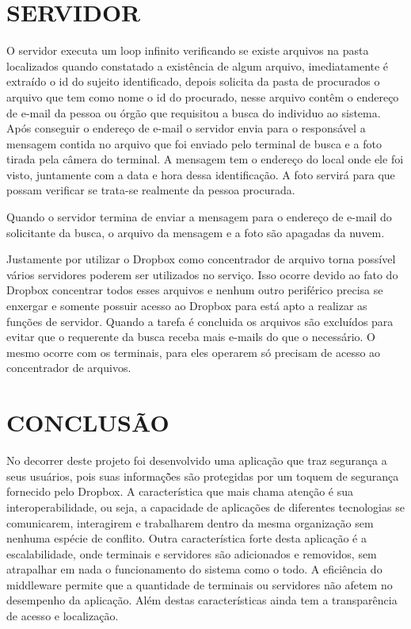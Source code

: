 \documentclass[letterpaper, 10 pt, conference]{ieeeconf}  %
\begin{document}
\section{SERVIDOR}
O servidor executa um loop infinito verificando se existe arquivos na pasta localizados quando constatado a exist\^encia de algum arquivo, imediatamente \'e extra\'ido o id do sujeito identificado, depois solicita da pasta de procurados o arquivo que tem como nome o id do procurado, nesse arquivo cont\^em o endere\c{c}o de e-mail da pessoa ou \'org\~ao que requisitou a busca do individuo ao sistema. Ap\'os conseguir o endere\c{c}o de e-mail o servidor envia para o respons\'avel a mensagem contida no arquivo que foi enviado pelo terminal de busca e a foto tirada pela c\^amera do terminal. A mensagem tem o endere\c{c}o do local onde ele foi visto, juntamente com a data e hora dessa identifica\c{c}\~ao. A foto servir\'a para que possam verificar se trata-se realmente da pessoa procurada.  

Quando o servidor termina de enviar a mensagem para o endere\c{c}o de e-mail do solicitante da busca, o arquivo da mensagem e a foto s\~ao apagadas da nuvem.

Justamente por utilizar o Dropbox como concentrador de arquivo torna poss\'ivel v\'arios servidores poderem ser utilizados no servi\c{c}o. Isso ocorre devido ao fato do Dropbox concentrar todos esses arquivos e nenhum outro perif\'erico precisa se enxergar e somente possuir acesso ao Dropbox para est\'a apto a realizar as fun\c{c}\~oes de servidor. Quando a tarefa é concluida os arquivos s\~ao exclu\'idos para evitar que o requerente da busca receba mais e-mails do que o necess\'ario. O mesmo ocorre com os terminais, para eles operarem s\'o precisam de acesso ao concentrador de arquivos.  

\section{CONCLUS\~AO}

No decorrer deste projeto foi desenvolvido uma aplica\c{c}\~ao que traz seguran\c{c}a a seus usu\'arios, pois suas informa\c{c}\~ões s\~ao protegidas por um toquem de segurança fornecido pelo Dropbox. A caracter\'istica que mais chama aten\c{c}\~ao \'e sua interoperabilidade, ou seja, a capacidade de aplica\c{c}\~oes de diferentes tecnologias se comunicarem, interagirem e trabalharem dentro da mesma organiza\c{c}\~ao sem nenhuma esp\'ecie de conflito. Outra caracter\'istica forte desta aplicação \'e a escalabilidade, onde terminais e servidores s\~ao adicionados e removidos, sem atrapalhar em nada o funcionamento do sistema como o todo. A efici\^encia do middleware permite que a quantidade de terminais ou servidores n\~ao afetem no desempenho da aplica\c{c}\~ao.  Al\'em destas caracter\'isticas ainda tem a transpar\^encia de acesso e localiza\c{c}\~ao.   
\end{document}
